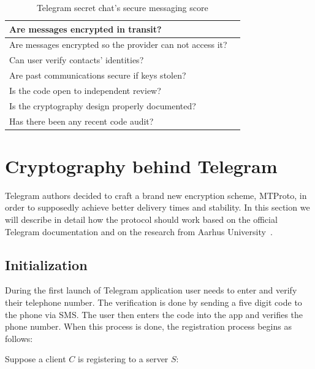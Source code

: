 \documentclass[thesis=M,english]{FITthesis}[2012/10/20]
\newcommand{\cmark}{\ding{51}}%
\begin{document}
\begin{table}[H]
	\centering
	\caption{Telegram secret chat's secure messaging score}
	\label{tab:telegram-secret-eff}
	\begin{tabular}{|l|l|}
		\hline
		Are messages encrypted in transit? & \cmark \\\hline
		Are messages encrypted so the provider can not access it? & \cmark \\ \hline
		Can user verify contacts' identities? & \cmark \\ \hline
		Are past communications secure if keys stolen? & \cmark \\ \hline
		Is the code open to independent review? & \cmark \\ \hline
		Is the cryptography design properly documented? & \cmark \\ \hline
		Has there been any recent code audit? & \cmark \\ \hline
	\end{tabular}
\end{table}







\chapter{Cryptography behind Telegram}\label{telegramcrypto}

Telegram authors decided to craft a brand new encryption scheme, MTProto, in order to supposedly achieve better delivery times and stability. In this section we will describe in detail how the protocol should work based on the official Telegram documentation and on the research from Aarhus University~\cite{telegram-aarhus}.


\section{Initialization}\label{crypto-initialization}

During the first launch of Telegram application user needs to enter and verify their telephone number. The verification is done by sending a five digit code to the phone via SMS. The user then enters the code into the app and verifies the phone number. When this process is done, the registration process begins as follows:

Suppose a client $C$ is registering to a server $S$:
\end{document}
